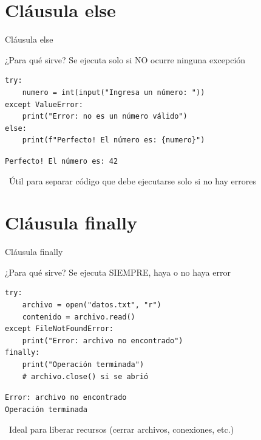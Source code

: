 \documentclass{beamer}
\begin{document}
\section{Cláusula else}

\begin{frame}[fragile]{Cláusula else \faCheckCircle}
\begin{conceptbox}{¿Para qué sirve?}
Se ejecuta solo si NO ocurre ninguna excepción
\end{conceptbox}

\begin{lstlisting}
try:
    numero = int(input("Ingresa un número: "))
except ValueError:
    print("Error: no es un número válido")
else:
    print(f"Perfecto! El número es: {numero}")
\end{lstlisting}

\vspace{-0.2cm}
\begin{tcolorbox}[colback=green!10,colframe=green,title={\small\faArrowCircleRight \ Salida (entrada: '42')},coltitle=fg0,left=3pt,right=3pt,top=2pt,bottom=2pt,boxsep=1pt]
\small\texttt{Perfecto! El número es: 42}
\end{tcolorbox}

\vspace{-0.1cm}
\begin{notebox}
\small\faLightbulb\ Útil para separar código que debe ejecutarse solo si no hay errores
\end{notebox}
\end{frame}

\section{Cláusula finally}

\begin{frame}[fragile]{Cláusula finally \faLock}
\begin{conceptbox}{¿Para qué sirve?}
Se ejecuta SIEMPRE, haya o no haya error
\end{conceptbox}

\begin{lstlisting}
try:
    archivo = open("datos.txt", "r")
    contenido = archivo.read()
except FileNotFoundError:
    print("Error: archivo no encontrado")
finally:
    print("Operación terminada")
    # archivo.close() si se abrió
\end{lstlisting}

\vspace{-0.2cm}
\begin{tcolorbox}[colback=green!10,colframe=green,title={\small\faArrowCircleRight \ Salida},coltitle=fg0,left=3pt,right=3pt,top=2pt,bottom=2pt,boxsep=1pt]
\small\texttt{Error: archivo no encontrado\\
Operación terminada}
\end{tcolorbox}

\vspace{-0.1cm}
\begin{notebox}
\small\faInfoCircle\ Ideal para liberar recursos (cerrar archivos, conexiones, etc.)
\end{notebox}
\end{frame}
\end{document}
